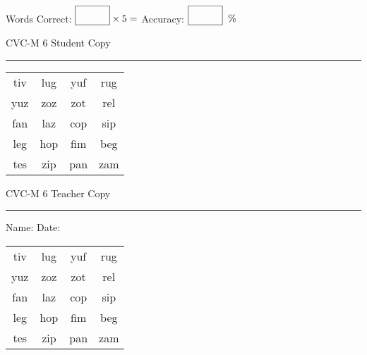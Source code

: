 \documentclass{memoir}
\begin{document}
\small

Words Correct: $\fbox{\phantom{\huge 100}} \times 5 = $ Accuracy: $\fbox{\phantom{\huge 100}}\;\; \%$ 

\vfill

\newpage


\footnotesize \noindent
CVC-M 6 \hfill Student Copy
\smallskip
\hrule

\Large

\setlength{\tabcolsep}{14pt}
\def\arraystretch{2}

{\selectfont


\begin{vplace}[0.5]
\begin{center}
\begin{tabular}{cccc}
tiv & lug & yuf & rug \\
yuz & zoz & zot & rel \\
fan & laz & cop & sip \\
leg & hop & fim & beg \\
tes & zip & pan & zam \\
\end{tabular}
\end{center}
\end{vplace}

}

\newpage

\footnotesize \noindent
CVC-M 6 \hfill Teacher Copy
\smallskip
\hrule

\small

\vfill

\noindent
Name: \underline{\hspace{1.75in}} \hfill Date: \underline{\hspace{1in}}

\Large

{\selectfont


\begin{vplace}[0.5]
\begin{center}
\begin{tabular}{cccc}
tiv & lug & yuf & rug \\
yuz & zoz & zot & rel \\
fan & laz & cop & sip \\
leg & hop & fim & beg \\
tes & zip & pan & zam \\
\end{tabular}
\end{center}
\end{vplace}



}
\end{document}

